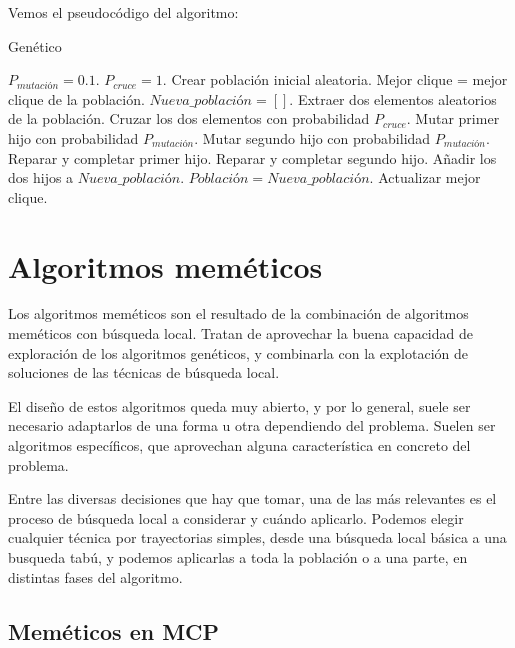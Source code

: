 Vemos el pseudocódigo del algoritmo:

\begin{algorithm}[H]
\caption{Genético}
  \begin{algorithmic}
    \State $P_{mutación} = 0.1$.
    \State $P_{cruce} = 1$.
    \State Crear población inicial aleatoria.
    \State Mejor clique = mejor clique de la población.
    \Repeat
      \State $Nueva\_población = []$.
      \Repeat
        \State Extraer dos elementos aleatorios de la población.
        \State Cruzar los dos elementos con probabilidad $P_{cruce}$.
        \State Mutar primer hijo con probabilidad $P_{mutación}$.
        \State Mutar segundo hijo con probabilidad $P_{mutación}$.
        \State Reparar y completar primer hijo.
        \State Reparar y completar segundo hijo.
        \State Añadir los dos hijos a $Nueva\_población$.
      \State $Población = Nueva\_población$.
      \State Actualizar mejor clique.
  \EndFunction
  \end{algorithmic}
\end{algorithm}


\section{Algoritmos meméticos}\label{memeticos}

Los algoritmos meméticos son el resultado de la combinación de algoritmos meméticos
con búsqueda local. Tratan de aprovechar la buena capacidad de exploración de los
algoritmos genéticos, y combinarla con la explotación de soluciones de las técnicas
de búsqueda local.

El diseño de estos algoritmos queda muy abierto, y por lo general, suele ser necesario
adaptarlos de una forma u otra dependiendo del problema. Suelen ser algoritmos específicos,
que aprovechan alguna característica en concreto del problema.

Entre las diversas decisiones que hay que tomar, una de las más relevantes es el
proceso de búsqueda local a considerar y cuándo aplicarlo. Podemos elegir cualquier
técnica por trayectorias simples, desde una búsqueda local básica a una busqueda
tabú, y podemos aplicarlas a toda la población o a una parte, en distintas
fases del algoritmo.

\subsection{Meméticos en MCP}

